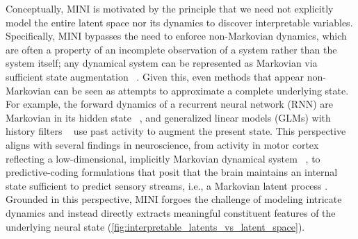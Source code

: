 Conceptually, MINI is motivated by the principle that we need not explicitly model the entire latent space nor its dynamics to discover interpretable variables. Specifically, MINI bypasses the need to enforce non-Markovian dynamics, which are often a property of an incomplete observation of a system rather than the system itself; any dynamical system can be represented as Markovian via sufficient state augmentation ~\cite{takens_1981_embedding}. Given this, even methods that appear non-Markovian can be seen as attempts to approximate a complete underlying state. For example, the forward dynamics of a recurrent neural network (RNN) are Markovian in its hidden state ~\cite{sussillo_2013_rnn_dynamics, goodfellow_2016_rnn}, and generalized linear models (GLMs) with history filters ~\cite{pillow_2008_glms, truccolo_2005_pointprocess} use past activity to augment the present state. This perspective aligns with several findings in neuroscience, from activity in motor cortex reflecting a low-dimensional, implicitly Markovian dynamical system ~\cite{churchland_2012_population_dynamics, shenoy_2013_dynamical_perspective}, to predictive-coding formulations that posit that the brain maintains an internal state sufficient to predict sensory streams, i.e., a Markovian latent process \cite{rao_1999_predictive_coding, doya_2007_bayesian_brain, friston_2010_free_energy}. Grounded in this perspective, MINI forgoes the challenge of modeling intricate dynamics and instead directly extracts meaningful constituent features of the underlying neural state (\autoref{fig:interpretable_latents_vs_latent_space}).

